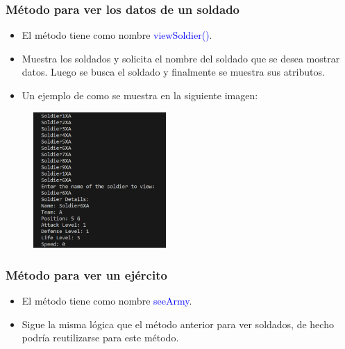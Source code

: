 \documentclass{article}
\begin{document}
\subsubsection{Método para ver los datos de un soldado}
\begin{itemize}
    \item El método tiene como nombre \textcolor{blue}{viewSoldier()}.
    \item Muestra los soldados y solicita el nombre del soldado que se desea mostrar datos. Luego se busca el soldado y finalmente se muestra sus atributos.
\end{itemize}


\begin{itemize}\begin{itemize}\item Un ejemplo de como se muestra en la siguiente imagen:
\end{itemize}\end{itemize}
\begin{figure}[H]
    \centering
    \includegraphics[width=0.45\textwidth,keepaspectratio]{img/12viewSoldier.png}
    \caption{}
\end{figure}


\subsubsection{Método para ver un ejército}
\begin{itemize}
    \item El método tiene como nombre \textcolor{blue}{seeArmy}.
    \item Sigue la misma lógica que el método anterior para ver soldados, de hecho podría reutilizarse para este método.
\end{itemize}

\end{document}
